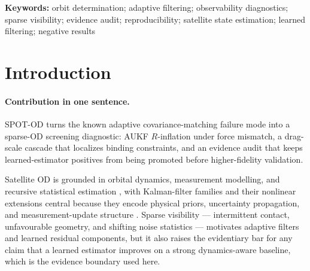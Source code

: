 \documentclass{article}
\begin{document}
\noindent\textbf{Keywords:} orbit determination; adaptive filtering; observability diagnostics; sparse visibility; evidence audit; reproducibility; satellite state estimation; learned filtering; negative results



\section{Introduction}

\paragraph{Contribution in one sentence.}
SPOT-OD turns the known adaptive covariance-matching failure mode into a sparse-OD screening diagnostic: AUKF \(R\)-inflation under force mismatch, a drag-scale cascade that localizes binding constraints, and an evidence audit that keeps learned-estimator positives from being promoted before higher-fidelity validation.

Satellite OD is grounded in orbital dynamics, measurement modelling, and recursive statistical estimation \cite{hoots1980spacetrack,vallado2006sgp4,vallado2013,montenbruck2000,tapley2004statistical}, with Kalman-filter families and their nonlinear extensions central because they encode physical priors, uncertainty propagation, and measurement-update structure \cite{kalman1960,jazwinski1970stochastic,julier1997unscented,wan2000unscented}. Sparse visibility --- intermittent contact, unfavourable geometry, and shifting noise statistics --- motivates adaptive filters and learned residual components, but it also raises the evidentiary bar for any claim that a learned estimator improves on a strong dynamics-aware baseline, which is the evidence boundary used here.
\end{document}
